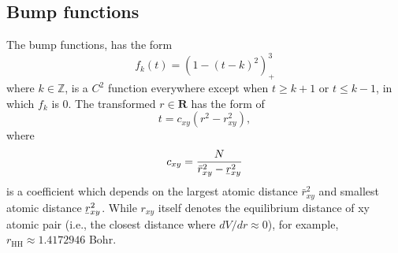 \documentclass[12pt]{article}
\newcommand{\ubar}[1]{\underaccent{\bar}{#1}}
\begin{document}
\subsection{Bump functions}
The bump functions, has the form
\begin{equation}
    f_k(t) = (1-(t-k)^2)^3_+
    \label{eq:f_bump}
\end{equation}
where $k \in \mathbb{Z}$, is a $C^2$ function everywhere except when $t \geq k+1$ or $t \leq k-1$, in which $f_k$ is $0$. The transformed $r \in \mathbf{R}$ has the form of  
\begin{equation}
    t = c_{xy}(r^2 - r^2_{xy}),
    \label{eq:t_bump}
\end{equation}
where
\begin{equation}
    c_{xy} = \frac{N}{\bar{r}_{xy}^2 - \ubar{r}_{xy}^2}
    \label{eq:c_xy}
\end{equation}
is a coefficient which depends on the largest atomic distance $\bar{r}_{xy}^2$ and smallest atomic distance $\ubar{r}_{xy}^2$. While $r_{xy}$ itself denotes the equilibrium distance of xy atomic pair (i.e., the closest distance where $dV/dr \approx 0$), for example, $r_{\text{HH}} \approx 1.4172946$ Bohr.
\end{document}
